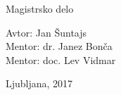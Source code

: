 \documentclass[10pt,a4paper]{article}
\begin{document}


\begin{center}


\vspace{3mm}


\vspace{2 cm}

{ \Large }Magistrsko delo\\             
\vspace{3cm}


{\large Avtor: Jan Šuntajs\\
\large Mentor: dr. Janez Bonča \\
\large Mentor: doc. Lev Vidmar 
\vspace{2cm}



Ljubljana, 2017}
\vfill
\begin{abstract}

\end{abstract}

\end{center}

\cleardoublepage

\thispagestyle{empty}


\clearpage
\pagestyle{fancy}
\fancyhf{}
\cfoot{\thepage}
\setcounter{page}{1}
\end{document}
